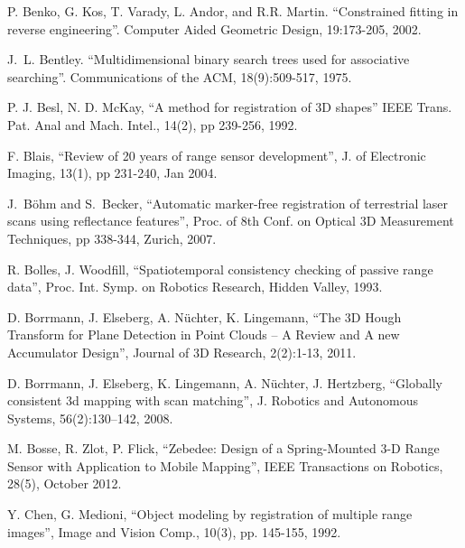 \documentclass[twocolumn,oneside]{book}
\begin{document}
\begin{thebibliography}{99}
P. Benko, G. Kos, T. Varady, L. Andor, and R.R. Martin.
``Constrained fitting in reverse engineering''. 
Computer Aided Geometric Design, 19:173-205, 2002.

J.~L. Bentley.
``Multidimensional binary search trees used for associative searching''.
Communications of the ACM, 18(9):509-517, 1975.


P. J. Besl, N. D. McKay,
``A method for registration of 3D shapes''
IEEE Trans. Pat. Anal and Mach. Intel., 14(2), pp 239-256, 1992.

F. Blais,
``Review of 20 years of range sensor development'',
J. of Electronic Imaging, 13(1), pp 231-240, Jan 2004.

J.~B{\"o}hm and S.~Becker,
``Automatic marker-free registration of terrestrial laser scans using reflectance features'',
Proc. of 8th Conf. on Optical 3D Measurement
  Techniques, pp 338-344, Zurich, 2007.

R. Bolles, J. Woodfill, 
``Spatiotemporal consistency checking of passive range data'',  
Proc. Int. Symp. on Robotics Research, Hidden Valley, 1993.

D. Borrmann, J. Elseberg, A. N{\"u}chter, K. Lingemann,
``The 3D Hough Transform for Plane Detection in Point Clouds -- A Review and A new Accumulator Design'',
Journal of 3D Research, 2(2):1-13, 2011.

D. Borrmann, J. Elseberg, K. Lingemann, A. N{\"u}chter, J. Hertzberg,
``Globally consistent 3d mapping with scan matching'',
J. Robotics and Autonomous Systems, 56(2):130–142, 2008.

M. Bosse, R. Zlot, P. Flick,
``Zebedee: Design of a Spring-Mounted 3-D Range
Sensor with Application to Mobile Mapping'',
IEEE Transactions on Robotics, 28(5), October 2012.

Y. Chen, G. Medioni,
``Object modeling by registration of multiple range images'',
Image and Vision Comp., 10(3), pp. 145-155, 1992.



\end{thebibliography}
\end{document}
